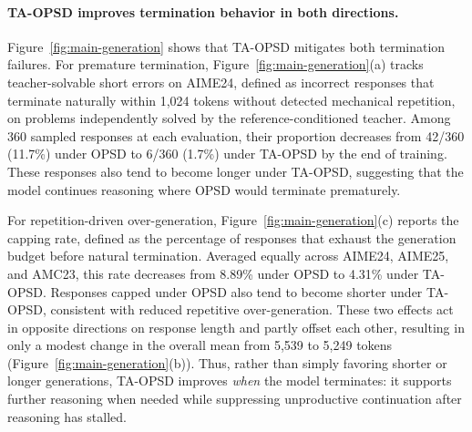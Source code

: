 \documentclass{article} %
\begin{document}
\paragraph{TA-OPSD improves termination behavior in both directions.}
Figure~\ref{fig:main-generation} shows that TA-OPSD mitigates both termination failures.
For premature termination, Figure~\ref{fig:main-generation}(a) tracks teacher-solvable short errors on AIME24, defined as incorrect responses that terminate naturally within 1,024 tokens without detected mechanical repetition, on problems independently solved by the reference-conditioned teacher.
Among 360 sampled responses at each evaluation, their proportion decreases from 42/360 (11.7\%) under OPSD to 6/360 (1.7\%) under TA-OPSD by the end of training.
These responses also tend to become longer under TA-OPSD, suggesting that the model continues reasoning where OPSD would terminate prematurely.

For repetition-driven over-generation, Figure~\ref{fig:main-generation}(c) reports the capping rate, defined as the percentage of responses that exhaust the generation budget before natural termination.
Averaged equally across AIME24, AIME25, and AMC23, this rate decreases from 8.89\% under OPSD to 4.31\% under TA-OPSD.
Responses capped under OPSD also tend to become shorter under TA-OPSD, consistent with reduced repetitive over-generation.
These two effects act in opposite directions on response length and partly offset each other, resulting in only a modest change in the overall mean from 5,539 to 5,249 tokens (Figure~\ref{fig:main-generation}(b)).
Thus, rather than simply favoring shorter or longer generations, TA-OPSD improves \emph{when} the model terminates: it supports further reasoning when needed while suppressing unproductive continuation after reasoning has stalled.
\end{document}

